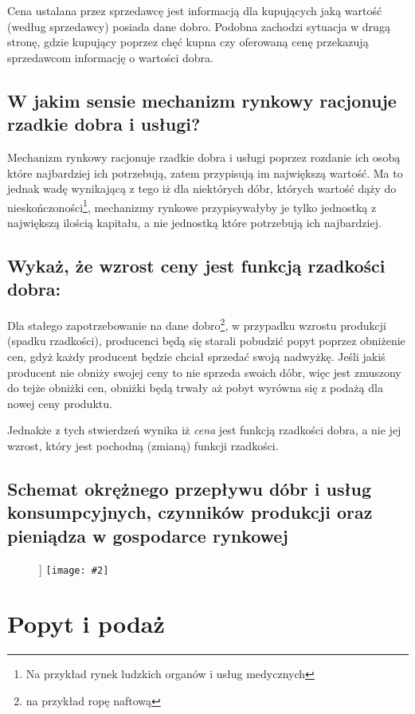 \documentclass[a4paper,12pt]{article}
\newcommand{\obrazek}[2]{
	\begin{figure}[h]]
		\centering
		\texttt{[image: \#2]}
	\end{figure}
}
\begin{document}
\vspace{.3cm}

Cena ustalana przez sprzedawcę jest informacją dla kupujących jaką wartość (według sprzedawcy) posiada dane dobro. Podobna zachodzi sytuacja w drugą stronę, gdzie kupujący poprzez chęć kupna czy oferowaną cenę przekazują sprzedawcom informację o wartości dobra.

\subsection{W jakim sensie mechanizm rynkowy racjonuje rzadkie dobra i usługi?}

Mechanizm rynkowy racjonuje rzadkie dobra i usługi poprzez rozdanie ich osobą które najbardziej ich potrzebują, zatem przypisują im największą wartość. Ma to jednak wadę wynikającą z tego iż dla niektórych dóbr, których wartość dąży do nieskończoności\footnote{Na przykład rynek ludzkich organów i usług medycznych}, mechanizmy rynkowe przypisywałyby je tylko jednostką z największą ilością kapitału, a nie jednostką które potrzebują ich najbardziej.

\subsection{Wykaż, że wzrost ceny jest funkcją rzadkości dobra:}

Dla stałego zapotrzebowanie na dane dobro\footnote{na przykład ropę naftową}, w przypadku wzrostu produkcji (spadku rzadkości), producenci będą się starali pobudzić popyt poprzez obniżenie cen, gdyż każdy producent będzie chciał sprzedać swoją nadwyżkę. Jeśli jakiś producent nie obniży swojej ceny to nie sprzeda swoich dóbr, więc jest zmuszony do tejże obniżki cen, obniżki będą trwały aż pobyt wyrówna się z podażą dla nowej ceny produktu.

Jednakże z tych stwierdzeń wynika iż \emph{cena} jest funkcją rzadkości dobra, a nie jej wzrost, który jest pochodną (zmianą) funkcji rzadkości.

\subsection{Schemat okrężnego przepływu dóbr i usług konsumpcyjnych, czynników produkcji oraz pieniądza w gospodarce rynkowej}

\obrazek{0.5}{schemat1.png}

\section{Popyt i podaż}
\end{document}

